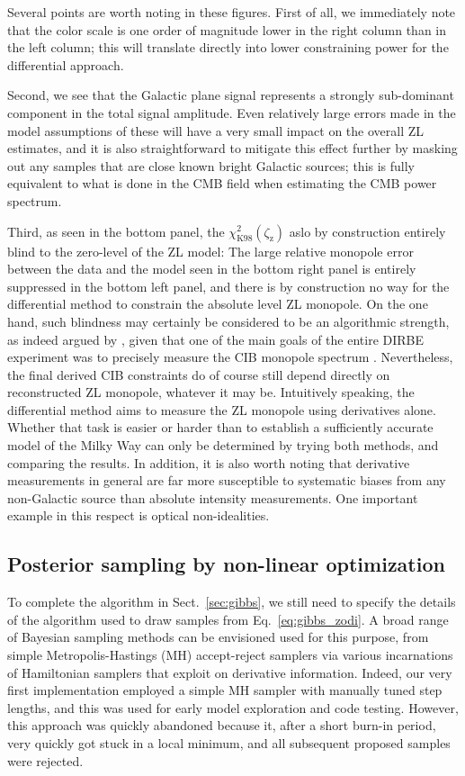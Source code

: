 \documentclass[twocolumn]{aa}
\begin{document}
Several points are worth noting in these figures. First of all, we
immediately note that the color scale is one order of magnitude lower
in the right column than in the left column; this will translate
directly into lower constraining power for the differential
approach.

Second, we see that the Galactic plane signal represents a strongly
sub-dominant component in the total signal amplitude. Even relatively
large errors made in the model assumptions of these will have a very
small impact on the overall ZL estimates, and it is also
straightforward to mitigate this effect further by masking out any
samples that are close known bright Galactic sources; this is fully
equivalent to what is done in the CMB field when estimating the CMB
power spectrum.

Third, as seen in the bottom panel, the $\chi^2_{\mathrm{K98}}
(\zeta_{\mathrm{z}})$ aslo by construction entirely blind to the
zero-level of the ZL model: The large relative monopole error between
the data and the model seen in the bottom right panel is entirely
suppressed in the bottom left panel, and there is by construction no
way for the differential method to constrain the absolute level ZL
monopole. On the one hand, such blindness may certainly be considered
to be an algorithmic strength, as indeed argued by
\citet{Kelsall1998}, given that one of the main goals of the entire
DIRBE experiment was to precisely measure the CIB monopole spectrum
\citep{hauser1998}. Nevertheless, the final derived CIB constraints do
of course still depend directly on reconstructed ZL monopole, whatever
it may be. Intuitively speaking, the differential method aims to
measure the ZL monopole using derivatives alone. Whether that task is
easier or harder than to establish a sufficiently accurate model of
the Milky Way can only be determined by trying both methods, and
comparing the results. In addition, it is also worth noting that
derivative measurements in general are far more susceptible to
systematic biases from any non-Galactic source than absolute intensity
measurements. One important example in this respect is optical
non-idealities.

\subsection{Posterior sampling by non-linear optimization}
\label{sec:nonlin}


To complete the algorithm in Sect.~\ref{sec:gibbs}, we still need to
specify the details of the algorithm used to draw samples from
Eq.~\eqref{eq:gibbs_zodi}. A broad range of Bayesian sampling methods
can be envisioned used for this purpose, from simple
Metropolis-Hastings (MH) accept-reject samplers via various
incarnations of Hamiltonian samplers that exploit on derivative
information. Indeed, our very first implementation employed a simple
MH sampler with manually tuned step lengths, and this was used for
early model exploration and code testing. However, this approach was
quickly abandoned because it, after a short burn-in period, very
quickly got stuck in a local minimum, and all subsequent proposed
samples were rejected.
\end{document}
